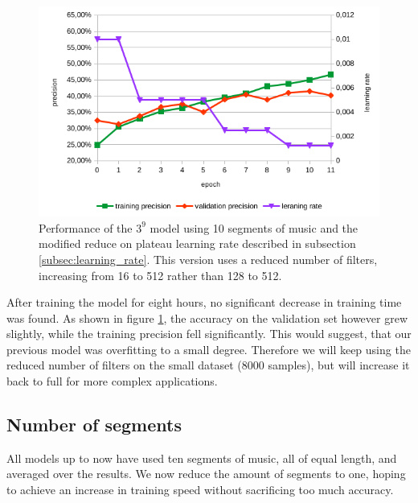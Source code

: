 \begin{figure}[!htb]
	\centering
	\includegraphics[width=.9\linewidth]{images/sample-dcnn-m3-n9-seg10-16_512-plateau_mod.png}
	\caption{Performance of the $3^9$ model using 10 segments of music and the modified reduce on plateau learning rate described in subsection \ref{subsec:learning_rate}. This version uses a reduced number of filters, increasing from 16 to 512 rather than 128 to 512.}
	\label{fig:sample-dcnn-m3-n9-seg10-16_512-plateau_mod}
\end{figure}

After training the model for eight hours, no significant decrease in training time was found. As shown in figure \ref{fig:sample-dcnn-m3-n9-seg10-16_512-plateau_mod}, the accuracy on the validation set however grew slightly, while the training precision fell significantly. This would suggest, that our previous model was overfitting to a small degree. Therefore we will keep using the reduced number of filters on the small dataset (8000 samples), but will increase it back to full for more complex applications.

\subsection{Number of segments}
\label{subsec:segments}

All models up to now have used ten segments of music, all of equal length, and averaged over the  results. We now reduce the amount of segments to one, hoping to achieve an increase in training speed without sacrificing too much accuracy.

